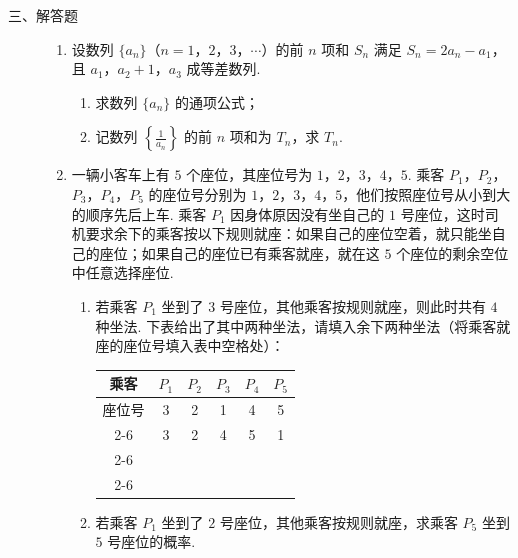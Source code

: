 \begin{description}

    \item[三、解答题]

    \begin{enumerate}[leftmargin=5pt]

      \addtocounter{enumi}{+15}

        \item 设数列 \(\{a_n\}\)（\(n = 1\)，\(2\)，\(3\)，\(\cdots\)）的前 \(n\) 项和 \(S_n\) 满足 \(S_n = 2a_n - a_1\)，且 \(a_1\)，\(a_2 + 1\)，\(a_3\) 成等差数列.

\begin{enumerate}
\item 求数列 \(\{a_n\}\) 的通项公式；
\item 记数列 \(\left\{\frac{1}{a_n}\right\}\) 的前 \(n\) 项和为 \(T_n\)，求 \(T_n\).
\end{enumerate}

        \item 一辆小客车上有 \(5\) 个座位，其座位号为 \(1\)，\(2\)，\(3\)，\(4\)，\(5\). 乘客 \(P_1\)，\(P_2\)，\(P_3\)，\(P_4\)，\(P_5\) 的座位号分别为 \(1\)，\(2\)，\(3\)，\(4\)，\(5\)，他们按照座位号从小到大的顺序先后上车. 乘客 \(P_1\) 因身体原因没有坐自己的 \(1\) 号座位，这时司机要求余下的乘客按以下规则就座：如果自己的座位空着，就只能坐自己的座位；如果自己的座位已有乘客就座，就在这 \(5\) 个座位的剩余空位中任意选择座位.

\begin{enumerate}
\item 若乘客 \(P_1\) 坐到了 \(3\) 号座位，其他乘客按规则就座，则此时共有 \(4\) 种坐法. 下表给出了其中两种坐法，请填入余下两种坐法（将乘客就座的座位号填入表中空格处）：

\begin{center}
\begin{tabular}{|c|c|c|c|c|c|}
\hline
乘客 & \(P_1\) & \(P_2\) & \(P_3\) & \(P_4\) & \(P_5\) \\
\hline
座位号 & 3 & 2 & 1 & 4 & 5 \\
\cline{2-6}
 & 3 & 2 & 4 & 5 & 1 \\
\cline{2-6}
 &  &  &  &  &  \\
\cline{2-6}
 &  &  &  &  &  \\
\hline
\end{tabular}
\end{center}

\item 若乘客 \(P_1\) 坐到了 \(2\) 号座位，其他乘客按规则就座，求乘客 \(P_5\) 坐到 \(5\) 号座位的概率.
\end{enumerate}


\end{enumerate}
\end{description}
